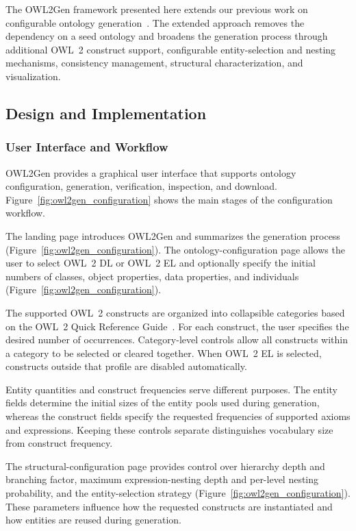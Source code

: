 The OWL2Gen framework presented here extends our previous work on
configurable ontology generation~\cite{singh2024owl2gen}. The extended
approach removes the dependency on a seed ontology and broadens the
generation process through additional OWL~2 construct support,
configurable entity-selection and nesting mechanisms, consistency
management, structural characterization, and visualization.


\subsection{Design and Implementation}


\subsubsection{User Interface and Workflow}
\label{sec:gui_OWL2Gen1}

OWL2Gen provides a graphical user interface that supports ontology
configuration, generation, verification, inspection, and download.
Figure~\ref{fig:owl2gen_configuration} shows the main stages of the
configuration workflow.

The landing page introduces OWL2Gen and summarizes the generation process
(Figure~\ref{fig:owl2gen_configuration}).
The ontology-configuration page allows the user to select OWL~2 DL or
OWL~2 EL and optionally specify the initial numbers of classes, object
properties, data properties, and individuals
(Figure~\ref{fig:owl2gen_configuration}).

The supported OWL~2 constructs are organized into collapsible categories
based on the OWL~2 Quick Reference Guide~\cite{owl2}. For each construct,
the user specifies the desired number of occurrences. Category-level
controls allow all constructs within a category to be selected or cleared
together. When OWL~2 EL is selected, constructs outside that profile are
disabled automatically.

Entity quantities and construct frequencies serve different purposes.
The entity fields determine the initial sizes of the entity pools used
during generation, whereas the construct fields specify the requested
frequencies of supported axioms and expressions. Keeping these controls
separate distinguishes vocabulary size from construct frequency.

The structural-configuration page provides control over hierarchy depth
and branching factor, maximum expression-nesting depth and per-level
nesting probability, and the entity-selection strategy
(Figure~\ref{fig:owl2gen_configuration}).
These parameters influence how the requested constructs are instantiated
and how entities are reused during generation.

